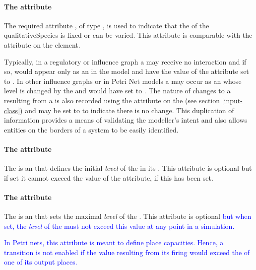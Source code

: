 \paragraph{The  attribute}
The required attribute , of type , is used to indicate that the  of the qualitativeSpecies is fixed or can be varied. This attribute is comparable with the  attribute on the  element.

Typically, in a regulatory or influence graph a \QualitativeSpecies may receive no interaction and if so, would appear only as an \Input in the model and have the value of the  attribute set to . In other influence graphs or in Petri Net models a \QualitativeSpecies may occur as an \Input whose level is changed by the \Transition and would have  set to .  The nature of changes to a \QualitativeSpecies resulting from a \Transition is also recorded using the  attribute on the \Input (see section \ref{input-class}) and may be set to  to indicate there is no change. This duplication of information provides a means of validating the modeller's intent and also allows entities on the borders of a system to be easily identified.
 


\paragraph{The   attribute}
The  is an  that defines the initial \emph{level} of the \QualitativeSpecies in its . This attribute is optional but if set it cannot exceed the value of the  attribute, if this has been set.

\paragraph{The  attribute}
The  is an  that sets the maximal \emph{level} of the . This attribute is optional \textcolor{blue}{but when set, the \emph{level} of the \QualitativeSpecies must not exceed this value at any point in a simulation.}

\textcolor{blue}{In Petri nets, this attribute is meant to define place capacities. Hence, a transition is not enabled if the value resulting from its firing would exceed the   of one of its output places. }

